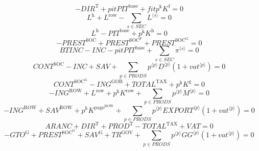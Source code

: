 \begin{equation}
-{D\!I\!R}^{\mathrm{T}} + {{p\!i\!t}} {{P\!I\!T}^{\mathrm{base}}} + {{f\!i\!t}} {p^{\mathrm{k}}} {K^{\mathrm{f}}} = 0
\end{equation}
\begin{equation}
L^{\mathrm{h}} + L^{\mathrm{row}} - \sum_{s\in {S\!E\!C}} {L}^{\langle s\rangle} = 0
\end{equation}
\begin{equation}
L^{\mathrm{h}} - {P\!I\!T}^{\mathrm{base}} + {p^{\mathrm{k}}} {K^{\mathrm{h}}} = 0
\end{equation}
\begin{equation}
-{P\!R\!E\!S\!T}^{\mathrm{SOC}} + {P\!R\!E\!S\!T}^{\mathrm{SOC}^{\mathrm{F}}} + {P\!R\!E\!S\!T}^{\mathrm{SOC}^{\mathrm{G}}} = 0
\end{equation}
\begin{equation}
{B\!T\!I\!N\!C} - {I\!N\!C} - {{p\!i\!t}} {{P\!I\!T}^{\mathrm{base}}} + \sum_{s\in {S\!E\!C}} {\pi}^{\langle s\rangle} = 0
\end{equation}
\begin{equation}
{C\!O\!N\!T}^{\mathrm{SOC}} - {I\!N\!C} + {S\!A\!V} + \sum_{p\in {P\!R\!O\!D\!S}} {{p}^{\langle p\rangle}} {{D}^{\langle p\rangle}} \left(1 + {{v\!a\!t}}^{\langle p\rangle}\right) = 0
\end{equation}
\begin{equation}
{C\!O\!N\!T}^{\mathrm{SOC}^{\mathrm{G}}} - {I\!N\!G}^{\mathrm{GOB}} + {T\!O\!T\!A\!L}^{\mathrm{TAX}} + {p^{\mathrm{k}}} {K^{\mathrm{g}}} = 0
\end{equation}
\begin{equation}
-{I\!N\!G}^{\mathrm{ROW}} + L^{\mathrm{row}} + {p^{\mathrm{k}}} {K^{\mathrm{row}}} + \sum_{p\in {P\!R\!O\!D\!S}} {{p}^{\langle p\rangle}} {{M}^{\langle p\rangle}} = 0
\end{equation}
\begin{equation}
-{I\!N\!G}^{\mathrm{ROW}} + {S\!A\!V}^{\mathrm{ROW}} + {p^{\mathrm{k}}} {K^{\mathrm{pago}^{\mathrm{ROW}}}} + \sum_{p\in {P\!R\!O\!D\!S}} {{p}^{\langle p\rangle}} {{{E\!X\!P\!O\!R\!T}}^{\langle p\rangle}} \left(1 + {{v\!a\!t}}^{\langle p\rangle}\right) = 0
\end{equation}
\begin{equation}
{A\!R\!A\!N\!C} + {D\!I\!R}^{\mathrm{T}} + {P\!R\!O\!D}^{\mathrm{T}} - {T\!O\!T\!A\!L}^{\mathrm{TAX}} + {V\!A\!T} = 0
\end{equation}
\begin{equation}
-{G\!T\!O}^{\mathrm{G}} + {P\!R\!E\!S\!T}^{\mathrm{SOC}^{\mathrm{G}}} + {S\!A\!V}^{\mathrm{G}} + {T\!R}^{\mathrm{GOV}} + \sum_{p\in {P\!R\!O\!D\!S}} {{p}^{\langle p\rangle}} {{{G\!G}}^{\langle p\rangle}} \left(1 + {{v\!a\!t}}^{\langle p\rangle}\right) = 0
\end{equation}
